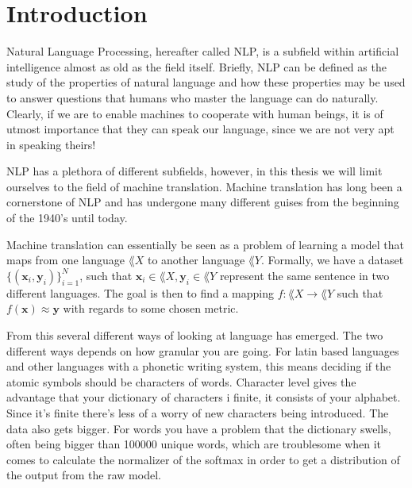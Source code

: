 \chapter{Introduction}
\label{IntroductionCh}

Natural Language Processing, hereafter called NLP, is a subfield within
artificial intelligence almost 
as old as the field itself. Briefly, NLP can be defined as the study of the
properties of natural language and how these properties may be used
to answer questions that humans who master the language can do naturally.
Clearly, if we are to enable machines to cooperate with human beings, it is of
utmost importance that they can speak our language, since we are not very apt in
speaking theirs!

NLP has a plethora of different subfields, however, in this thesis we will limit
ourselves to the field of machine translation. Machine translation has long been
a cornerstone of NLP and has undergone many different guises from the beginning
of the 1940's until today.

Machine translation can essentially be seen as a problem of learning a model
that maps from one language $\lang{X}$ to another language $\lang{Y}$. Formally,
we have a dataset $\{(\bm{x}_i, \bm{y}_i)\}_{i = 1}^{N}$, such that $\bm{x}_i
\in \lang{X}, \bm{y}_i \in \lang{Y}$ represent the same sentence in two
different languages. The goal is then to find a mapping $f : \lang{X} \to
\lang{Y}$ such that $f(\bm{x}) \approx \bm{y}$ with regards to some chosen
metric.

From this several different ways of looking at language has emerged. The two
different ways depends on how granular you are going. For latin based languages
and other languages with a phonetic writing system, this means deciding if the
atomic symbols should be characters of words. Character level gives the
advantage that your dictionary of characters i finite, it consists of your
alphabet. Since it's finite there's less of a worry of new characters being
introduced. The data also gets bigger. For words you have a problem that the
dictionary swells, often being bigger than 100000 unique words, which are
troublesome when it comes to calculate the normalizer of the softmax in order to
get a distribution of the output from the raw model.


